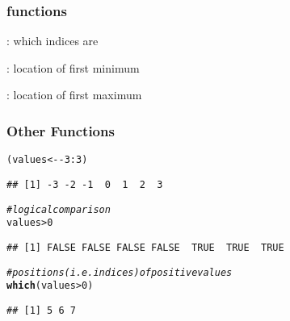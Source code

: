 \documentclass[12pt]{beamer}\usepackage[]{graphicx}\usepackage[]{color}
\makeatletter
\newcommand{\hlnum}[1]{\textcolor[rgb]{0.686,0.059,0.569}{#1}}%
\newcommand{\hlcom}[1]{\textcolor[rgb]{0.678,0.584,0.686}{\textit{#1}}}%
\newcommand{\hlopt}[1]{\textcolor[rgb]{0,0,0}{#1}}%
\newcommand{\hlstd}[1]{\textcolor[rgb]{0.345,0.345,0.345}{#1}}%
\newcommand{\hlkwb}[1]{\textcolor[rgb]{0.69,0.353,0.396}{#1}}%
\newcommand{\hlkwd}[1]{\textcolor[rgb]{0.737,0.353,0.396}{\textbf{#1}}}%
\newenvironment{kframe}{%
 \def\at@end@of@kframe{}%
 \ifinner\ifhmode%
  \def\at@end@of@kframe{\end{minipage}}%
  \begin{minipage}{\columnwidth}%
 \fi\fi%
 \def\FrameCommand##1{\hskip\@totalleftmargin \hskip-\fboxsep
 \colorbox{shadecolor}{##1}\hskip-\fboxsep
     \hskip-\linewidth \hskip-\@totalleftmargin \hskip\columnwidth}%
 \MakeFramed {\advance\hsize-\width
   \@totalleftmargin\z@ \linewidth\hsize
   \@setminipage}}%
 {\par\unskip\endMakeFramed%
 \at@end@of@kframe}
\newenvironment{knitrout}{}{} %
\makeatother
\begin{document}

\begin{frame}[fragile]
\frametitle{ functions}

\bi
  \item {}: which indices are 
  \item {}: location of first minimum
  \item {}: location of first maximum
\ei

\end{frame}


\begin{frame}[fragile]
\frametitle{Other Functions}

\begin{knitrout}\footnotesize
{}\color{fgcolor}\begin{kframe}
\begin{alltt}
\hlstd{(values} \hlkwb{<-} \hlopt{-}\hlnum{3}\hlopt{:}\hlnum{3}\hlstd{)}
\end{alltt}
\begin{verbatim}
## [1] -3 -2 -1  0  1  2  3
\end{verbatim}
\begin{alltt}
\hlcom{# logical comparison}
\hlstd{values} \hlopt{>} \hlnum{0}
\end{alltt}
\begin{verbatim}
## [1] FALSE FALSE FALSE FALSE  TRUE  TRUE  TRUE
\end{verbatim}
\begin{alltt}
\hlcom{# positions (i.e. indices) of positive values}
\hlkwd{which}\hlstd{(values} \hlopt{>} \hlnum{0}\hlstd{)}
\end{alltt}
\begin{verbatim}
## [1] 5 6 7
\end{verbatim}
\end{kframe}
\end{knitrout}

\end{frame}

\end{document}
